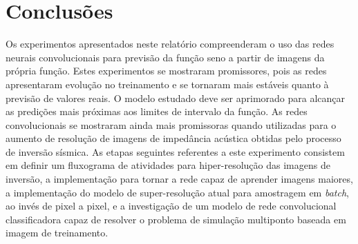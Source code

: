 \documentclass[11pt]{article}
\begin{document}
\section{Conclusões}
Os experimentos apresentados neste relatório compreenderam o uso das redes neurais convolucionais para previsão da função seno a partir de
imagens da própria função. Estes experimentos se mostraram promissores, pois as redes apresentaram evolução no treinamento e se tornaram mais estáveis quanto
à previsão de valores reais. O modelo estudado deve ser aprimorado para alcançar as predições mais próximas aos limites de intervalo da função.
As redes convolucionais se mostraram ainda mais promissoras quando utilizadas para o aumento de resolução de imagens
de impedância acústica obtidas pelo processo de inversão sísmica.
As etapas seguintes referentes a este experimento consistem em definir um fluxograma de atividades para hiper-resolução das imagens de inversão, a implementação para
tornar a rede capaz de aprender imagens maiores, a implementação
do modelo de super-resolução atual para amostragem em \textit{batch}, ao invés de pixel a pixel, e a investigação
de um modelo de rede convolucional classificadora capaz de resolver o problema de simulação multiponto baseada em imagem de treinamento.

\nocite{*}

\begin{spacing}{1}
   
   
 \end{spacing}
\end{document}
